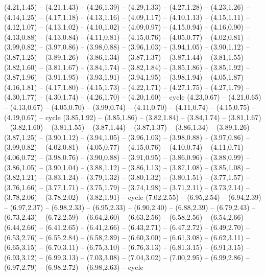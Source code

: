 \expandafter\def\csname geo:gebiet:ARG\endcsname{
  (4.21,1.45) -- (4.21,1.43) -- (4.26,1.39) -- (4.29,1.33) -- (4.27,1.28) -- (4.23,1.26) -- (4.14,1.25) -- (4.17,1.18) -- (4.13,1.16) -- (4.09,1.17) -- (4.10,1.13) -- (4.15,1.11) -- (4.12,1.07) -- (4.13,1.02) -- (4.10,1.02) -- (4.09,0.97) -- (4.15,0.94) -- (4.16,0.90) -- (4.13,0.88) -- (4.13,0.84) -- (4.11,0.81) -- (4.15,0.76) -- (4.05,0.77) -- (4.02,0.81) -- (3.99,0.82) -- (3.97,0.86) -- (3.98,0.88) -- (3.96,1.03) -- (3.94,1.05) -- (3.90,1.12) -- (3.87,1.25) -- (3.89,1.26) -- (3.86,1.34) -- (3.87,1.37) -- (3.87,1.44) -- (3.81,1.55) -- (3.82,1.60) -- (3.81,1.67) -- (3.84,1.74) -- (3.82,1.84) -- (3.85,1.86) -- (3.85,1.92) -- (3.87,1.96) -- (3.91,1.95) -- (3.93,1.91) -- (3.94,1.95) -- (3.98,1.94) -- (4.05,1.87) -- (4.16,1.81) -- (4.17,1.80) -- (4.15,1.73) -- (4.22,1.71) -- (4.27,1.75) -- (4.27,1.79) -- (4.30,1.77) -- (4.30,1.74) -- (4.26,1.70) -- (4.20,1.60) -- cycle}
\expandafter\def\csname geo:gebiet:CHL\endcsname{
  (4.23,0.67) -- (4.21,0.65) -- (4.13,0.67) -- (4.05,0.70) -- (3.99,0.74) -- (4.11,0.70) -- (4.11,0.74) -- (4.15,0.75) -- (4.19,0.67) -- cycle
  (3.85,1.92) -- (3.85,1.86) -- (3.82,1.84) -- (3.84,1.74) -- (3.81,1.67) -- (3.82,1.60) -- (3.81,1.55) -- (3.87,1.44) -- (3.87,1.37) -- (3.86,1.34) -- (3.89,1.26) -- (3.87,1.25) -- (3.90,1.12) -- (3.94,1.05) -- (3.96,1.03) -- (3.98,0.88) -- (3.97,0.86) -- (3.99,0.82) -- (4.02,0.81) -- (4.05,0.77) -- (4.15,0.76) -- (4.10,0.74) -- (4.11,0.71) -- (4.06,0.72) -- (3.98,0.76) -- (3.90,0.88) -- (3.91,0.95) -- (3.86,0.96) -- (3.88,0.99) -- (3.86,1.05) -- (3.90,1.04) -- (3.88,1.12) -- (3.86,1.13) -- (3.87,1.08) -- (3.85,1.08) -- (3.82,1.21) -- (3.83,1.24) -- (3.79,1.32) -- (3.80,1.32) -- (3.80,1.51) -- (3.77,1.57) -- (3.76,1.66) -- (3.77,1.71) -- (3.75,1.79) -- (3.74,1.98) -- (3.71,2.11) -- (3.73,2.14) -- (3.78,2.06) -- (3.78,2.02) -- (3.82,1.91) -- cycle}
\expandafter\def\csname geo:gebiet:COD\endcsname{
  (7.02,2.55) -- (6.95,2.54) -- (6.94,2.39) -- (6.97,2.37) -- (6.98,2.33) -- (6.95,2.33) -- (6.90,2.40) -- (6.88,2.39) -- (6.79,2.43) -- (6.73,2.43) -- (6.72,2.59) -- (6.64,2.60) -- (6.63,2.56) -- (6.58,2.56) -- (6.54,2.66) -- (6.44,2.66) -- (6.41,2.65) -- (6.41,2.66) -- (6.43,2.71) -- (6.47,2.72) -- (6.49,2.70) -- (6.53,2.76) -- (6.55,2.84) -- (6.58,2.89) -- (6.60,3.00) -- (6.61,3.08) -- (6.62,3.11) -- (6.65,3.15) -- (6.70,3.11) -- (6.75,3.10) -- (6.76,3.13) -- (6.81,3.15) -- (6.91,3.15) -- (6.93,3.12) -- (6.99,3.13) -- (7.03,3.08) -- (7.04,3.02) -- (7.00,2.95) -- (6.99,2.86) -- (6.97,2.79) -- (6.98,2.72) -- (6.98,2.63) -- cycle}
